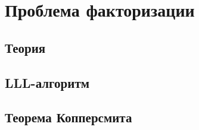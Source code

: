 \section{Проблема факторизации}

\subsection{Теория}

\subsection{LLL-алгоритм}

\subsection{Теорема Копперсмита}